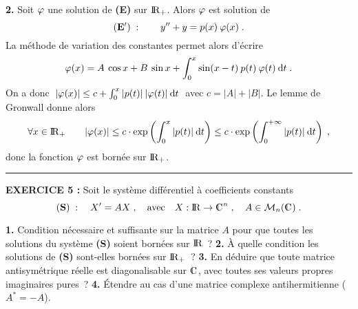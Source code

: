\documentclass{article}
\begin{document}
\msk
{\bf 2.} Soit $\varphi$ une solution de {\bf (E)} sur ${\rm I\kern-0.6mm R}_+$. Alors $\varphi$ est solution de\vv
$${\bf (E')}\;:\qquad y''+y=p(x)\>\varphi(x)\;.$$
La m\'ethode de variation des constantes permet alors d'\'ecrire\vv
$$\varphi(x)=A\>\cos x+B\>\sin x+\int_0^x\sin(x-t)\>p(t)\>\varphi(t)\>{\rm d}t\;.$$
On a donc $\;|\varphi(x)|\leq c+\int_0^x|p(t)|\>|\varphi(t)|\>{\rm d}t\;$ avec $c=|A|+|B|$. Le lemme de Gronwall donne alors\vv
$$\forall x\in{\rm I\kern-0.6mm R}_+\qquad |\varphi(x)|\leq c\cdot\exp\left(\int_0^x|p(t)|\>{\rm d}t\right)\leq c\cdot\exp\left(\int_0^{+\infty}|p(t)|\>{\rm d}t\right)\;,$$
donc la fonction $\varphi$ est born\'ee sur ${\rm I\kern-0.6mm R}_+$.

\bsk
\hrule
\eject

{\bf EXERCICE 5 :}\msk
Soit le syst\`eme diff\'erentiel \`a coefficients constants\vv
$${\bf (S)}\;:\quad X'=AX\;,\quad{\rm avec}\quad X:\rmat\vers\cmat^n\;,\quad A\in{\cal M}_n(\cmat)\;.$$
\par
{\bf 1.} Condition n\'ecessaire et suffisante sur la matrice $A$ pour que toutes les solutions du syst\`eme {\bf (S)} soient born\'ees sur ${\rm I\kern-0.6mm R}$~?\msk 
{\bf 2.} \`A quelle condition les solutions de {\bf (S)} sont-elles born\'ees sur ${\rm I\kern-0.6mm R}_+$~?\msk
{\bf 3.} En d\'eduire que toute matrice antisym\'etrique r\'eelle est diagonalisable sur $\cmat$, avec toutes ses valeurs propres imaginaires pures~?\msk
{\bf 4.} \'Etendre au cas d'une matrice complexe antihermitienne ($A^*=-A$).


\msk
\cl{- - - - - - - - - - - - - - - - - - - - - - - - - - - - - -}
\msk
\end{document}
